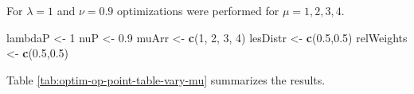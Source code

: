 \documentclass[
]{book}
\newenvironment{Shaded}{\begin{snugshade}}{\end{snugshade}}
\newcommand{\DecValTok}[1]{\textcolor[rgb]{0.00,0.00,0.81}{#1}}
\newcommand{\FloatTok}[1]{\textcolor[rgb]{0.00,0.00,0.81}{#1}}
\newcommand{\KeywordTok}[1]{\textcolor[rgb]{0.13,0.29,0.53}{\textbf{#1}}}
\newcommand{\NormalTok}[1]{#1}
\newcommand{\StringTok}[1]{\textcolor[rgb]{0.31,0.60,0.02}{#1}}
\begin{document}
For \(\lambda = 1\) and \(\nu = 0.9\) optimizations were performed for \(\mu = 1, 2, 3, 4\).

\begin{Shaded}
\begin{Highlighting}[]
\NormalTok{lambdaP <-}\StringTok{ }\DecValTok{1}
\NormalTok{nuP <-}\StringTok{ }\FloatTok{0.9}
\NormalTok{muArr <-}\StringTok{ }\KeywordTok{c}\NormalTok{(}\DecValTok{1}\NormalTok{, }\DecValTok{2}\NormalTok{, }\DecValTok{3}\NormalTok{, }\DecValTok{4}\NormalTok{)}
\NormalTok{lesDistr <-}\StringTok{ }\KeywordTok{c}\NormalTok{(}\FloatTok{0.5}\NormalTok{,}\FloatTok{0.5}\NormalTok{)}
\NormalTok{relWeights <-}\StringTok{ }\KeywordTok{c}\NormalTok{(}\FloatTok{0.5}\NormalTok{,}\FloatTok{0.5}\NormalTok{)}
\end{Highlighting}
\end{Shaded}

\begin{table}[H]

\caption{\label{tab:optim-op-point-table-vary-mu}Summary of optimization results for $\lambda = 1$, $\nu = 0.9$  and 4 values of $\mu$.}
\centering
{}
\end{table}

Table \ref{tab:optim-op-point-table-vary-mu} summarizes the results.
\end{document}
